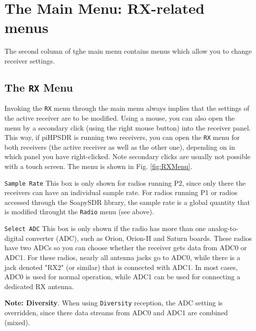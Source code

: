 \documentclass[12pt]{book}
\def\rett#1{\texttt{\color{red}#1}}
\def\bltt#1{\texttt{\color{blue}#1}}
\begin{document}
\chapter{The Main Menu: RX-related menus}

The second column of tghe main menu contains menus which allow you to change 
receiver settings.

\section{The \texttt{RX} Menu}

Invoking the \bltt{RX} menu through the main menu always implies that the settings
of the active receiver are to be modified. Using a mouse, you can also open the menu
by a secondary click (using the right mouse button) into the receiver panel. This way,
if piHPSDR is running two receivers, you can open the \bltt{RX} menu for both receivers
(the active receiver as well as the other one), depending on in which panel you have
right-clicked. Note secondary clicks are usually not possible with a touch screen.
The menu is shown in Fig. \ref{fig:RXMenu}.

\rett{Sample Rate} This box is only shown for radios running P2, since only there the
receivers can have an individual sample rate. For radios running P1 or radios accessed
through the SoapySDR library, the sample rate is a global quantity that is modified
throught the \bltt{Radio} menu (see above).

\rett{Select ADC} This box is only shown if the radio has more than one analog-to-digital
converter (ADC), such as Orion, Orion-II and Saturn boards. These radios have two ADCs so
you can choose whether the receiver gets data from ADC0 or ADC1. For these radios, nearly
all antenna jacks go to ADC0, while there is a jack denoted "RX2" (or similar) that 
is connected with ADC1. In most cases, ADC0 is used for normal operation, while ADC1
can be used for connecting a dedicated RX antenna. 

\textbf{Note: Diversity}. When using \bltt{Diversity} reception, the ADC setting is
overridden, since there data streams from ADC0 and ADC1 are combined (mixed).
\end{document}
